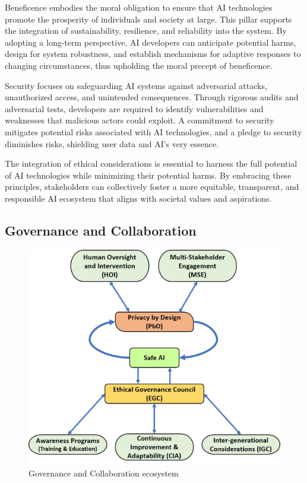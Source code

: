 \documentclass{article}
\begin{document}
Beneficence embodies the moral obligation to ensure that AI technologies promote the prosperity of individuals and society at large. This pillar supports the integration of sustainability, resilience, and reliability into the system. By adopting a long-term perspective, AI developers can anticipate potential harms, design for system robustness, and establish mechanisms for adaptive responses to changing circumstances, thus upholding the moral precept of beneficence.

Security focuses on safeguarding AI systems against adversarial attacks, unauthorized access, and unintended consequences. Through rigorous audits and adversarial tests, developers are required to identify vulnerabilities and weaknesses that malicious actors could exploit. A commitment to security mitigates potential risks associated with AI technologies, and a pledge to security diminishes risks, shielding user data and AI's very essence.

The integration of ethical considerations is essential to harness the full potential of AI technologies while minimizing their potential harms. By embracing these principles, stakeholders can collectively foster a more equitable, transparent, and responsible AI ecosystem that aligns with societal values and aspirations.

\subsection{Governance and Collaboration}

\begin{figure}[!htb]
\centering
\includegraphics[width=0.85\linewidth]{EGC.jpg}
\caption{\label{fig:1.7} Governance and Collaboration ecosystem}
\end{figure}
\end{document}
